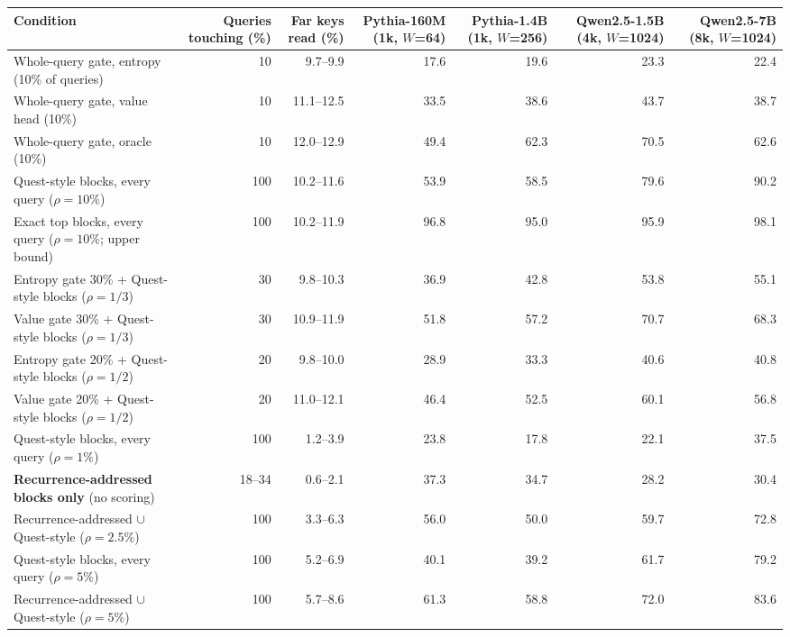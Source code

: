 \begin{tabular}{lrrrrrr}
\toprule
Condition & Queries touching (\%) & Far keys read (\%) & Pythia-160M (1k, $W$=64) & Pythia-1.4B (1k, $W$=256) & Qwen2.5-1.5B (4k, $W$=1024) & Qwen2.5-7B (8k, $W$=1024) \\
\midrule
Whole-query gate, entropy (10\% of queries) & 10 & 9.7--9.9 & 17.6 & 19.6 & 23.3 & 22.4 \\
Whole-query gate, value head (10\%) & 10 & 11.1--12.5 & 33.5 & 38.6 & 43.7 & 38.7 \\
Whole-query gate, oracle (10\%) & 10 & 12.0--12.9 & 49.4 & 62.3 & 70.5 & 62.6 \\
\addlinespace
Quest-style blocks, every query ($\rho=10\%$) & 100 & 10.2--11.6 & 53.9 & 58.5 & 79.6 & 90.2 \\
Exact top blocks, every query ($\rho=10\%$; upper bound) & 100 & 10.2--11.9 & 96.8 & 95.0 & 95.9 & 98.1 \\
\addlinespace
Entropy gate 30\% + Quest-style blocks ($\rho=1/3$) & 30 & 9.8--10.3 & 36.9 & 42.8 & 53.8 & 55.1 \\
Value gate 30\% + Quest-style blocks ($\rho=1/3$) & 30 & 10.9--11.9 & 51.8 & 57.2 & 70.7 & 68.3 \\
Entropy gate 20\% + Quest-style blocks ($\rho=1/2$) & 20 & 9.8--10.0 & 28.9 & 33.3 & 40.6 & 40.8 \\
Value gate 20\% + Quest-style blocks ($\rho=1/2$) & 20 & 11.0--12.1 & 46.4 & 52.5 & 60.1 & 56.8 \\
\addlinespace
Quest-style blocks, every query ($\rho=1\%$) & 100 & 1.2--3.9 & 23.8 & 17.8 & 22.1 & 37.5 \\
\textbf{Recurrence-addressed blocks only} (no scoring) & 18--34 & 0.6--2.1 & 37.3 & 34.7 & 28.2 & 30.4 \\
Recurrence-addressed $\cup$ Quest-style ($\rho=2.5\%$) & 100 & 3.3--6.3 & 56.0 & 50.0 & 59.7 & 72.8 \\
Quest-style blocks, every query ($\rho=5\%$) & 100 & 5.2--6.9 & 40.1 & 39.2 & 61.7 & 79.2 \\
Recurrence-addressed $\cup$ Quest-style ($\rho=5\%$) & 100 & 5.7--8.6 & 61.3 & 58.8 & 72.0 & 83.6 \\
\bottomrule
\end{tabular}

